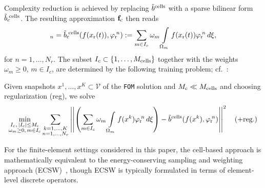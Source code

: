 \documentclass[onefignum,onetabnum]{siamart251104}
\newcommand{\bv}[1]{{\mathbf #1}}
\newcommand{\funSpace}[1]{\mathcal{#1}}
\newcommand{\com}[1]{{{#1}_{\rm{c}}}} %
\newcommand{\rom}[1]{{{#1}_{\rm{r}}}}
\newcommand{\Nr}{{N_r}}
\newcommand{\ffun}{{\bv{f}}}
\newcommand{\bform}{{b}}
\newcommand{\tL}{{\fs{\varphi}}}
\newcommand{\fs}[1]{{{#1}}} %
\newcommand{\wei}{{\omega}} %
\newcommand{\xp}{{\xi}} %
\newcommand{\acro}[1]{{\texttt{#1}}}  %
\begin{document}
Complexity reduction is achieved by replacing $\tilde{\bform}^{\rm cells}$ with a sparse bilinear form ${\tilde{\bform}}_c\!^{\rm cells}$. The resulting approximation $\com{\ffun}$ then reads
\begin{align*}
[\com{\ffun}(\rom{\bv{x}}(t))]_n = \com{\tilde{\bform}}\!^{\rm{cells}}({f}(\rom{\fs{x}}(t)), \rom{\tL}\!^n) :=
\sum_{m\in I_c} \wei_m \int\limits_{\Omega_m} {f}(\rom{\fs{x}}(t)) \rom{\tL}\!^n \,d\xp,
\end{align*}
for $n = 1,\ldots, \Nr$.
The subset $I_c \subset \{1,\ldots, M_{\rm cells} \}$ together with the weights $\wei_m \geq 0$, $m \in I_c$, are determined by the following training problem; cf.~\cite{art:comred-ecsw}:

Given snapshots $\fs{x}^1, \ldots, \fs{x}^K \subset \funSpace{V}$ of the \acro{FOM} solution and $\com{M} \ll M_{\rm cells}$ and choosing regularization (reg), we solve
{\small
\begin{align*} %
	\min_{\substack{I_c, \,|I_c| \leq \com{M}\\
			            \wei_m \geq 0, \,m \in I_c } }
\sum_{\substack{k = 1,\ldots,K\\ n= 1,\ldots,\Nr}}			            
			             \left|\left| \left(\sum_{m\in I_c} \wei_m \int\limits_{\Omega_m} {f}({\fs{x}}^k) \rom{\tL}\!^n \,d\xp \right)
			             - \tilde{\bform}^{\rm{cells}}({f}({\fs{x}}^k), \rom{\tL}\!^n)\right|\right|^2
\quad \text{(+reg.)}
\end{align*}
}%

\begin{rmrk}
For the finite-element settings considered in this paper, the cell-based approach is mathematically equivalent to the energy-con{\-}serving sampling and weighting approach (ECSW)~\cite{art:comred-ecsw,art:chan-EntropROM}, though ECSW is typically formulated in terms of element-level discrete operators.
\end{rmrk}


\end{document}
